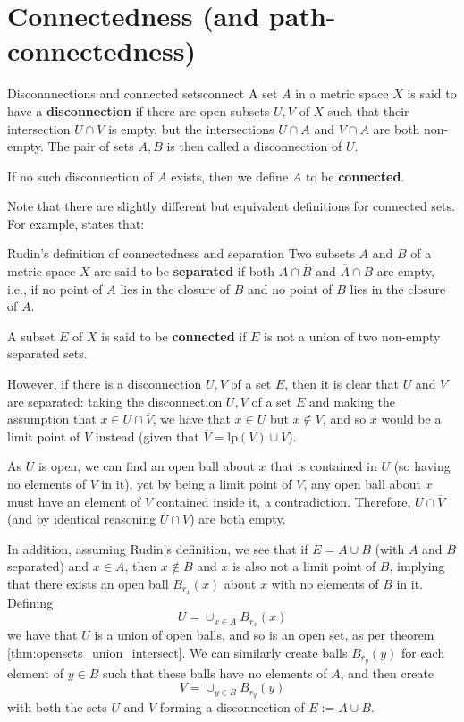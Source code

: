 \section{Connectedness (and path-connectedness)}

\begin{bdefin}{Disconnnections and connected sets}{connect}
A set $A$ in a metric space $X$ is said to have a \textbf{disconnection} if there are open subsets $U,V$ of $X$ such that their intersection $U \cap V$ is empty, but the intersections $U \cap A$ and $V \cap A$ are both non-empty. The pair of sets $A,B$ is then called a disconnection of $U$.

If no such disconnection of $A$ exists, then we define $A$ to be \textbf{connected}.
\end{bdefin}

Note that there are slightly different but equivalent definitions for connected sets. For example, \cite{rudin} states that:
\begin{bdefin}{Rudin's definition of connectedness and separation}{}
Two subsets $A$ and $B$ of a metric space $X$ are said to be \textbf{separated} if both $A \cap \overline{B}$ and $\overline{A} \cap B$ are empty, i.e., if no point of $A$ lies in the closure of $B$ and no point of $B$ lies in the closure of $A$.

A subset $E$ of $X$ is said to be \textbf{connected} if $E$ is not a union of two non-empty separated sets.
\end{bdefin}

However, if there is a disconnection $U,V$ of a set $E$, then it is clear that $U$ and $V$ are separated: taking the disconnection $U,V$ of a set $E$ and making the assumption that $x \in U \cap \overline{V}$, we have that $x \in U$ but $x \not\in V$, and so $x$ would be a limit point of $V$ instead (given that $\overline{V} = \text{lp}(V) \cup V$). 

As $U$ is open, we can find an open ball about $x$ that is contained in $U$ (so having no elements of $V$ in it), yet by being a limit point of $V$, any open ball about $x$ must have an element of $V$ contained inside it, a contradiction. Therefore, $U \cap \overline{V}$ (and by identical reasoning $\overline{U} \cap V$) are both empty.

In addition, assuming Rudin's definition, we see that if $E = A \cup B$ (with $A$ and $B$ separated) and $x \in A$, then $x \not\in B$ and $x$ is also not a limit point of $B$, implying that there exists an open ball $B_{r_{x}}(x)$ about $x$ with no elements of $B$ in it. Defining \[ U = \cup_{x \in A} B_{r_{x}}(x) \] we have that $U$ is a union of open balls, and so is an open set, as per theorem \ref{thm:opensets_union_intersect}. 
We can similarly create balls $B_{r_{y}}(y)$ for each element of $y \in B$ such that these balls have no elements of $A$, and then create \[V = \cup_{y \in B} B_{r_{y}}(y) \] with both the sets $U$ and $V$ forming a disconnection of $E := A \cup B$.


